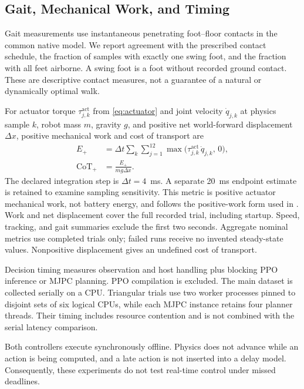 \documentclass[conference]{IEEEtran}
\begin{document}
\subsection{Gait, Mechanical Work, and Timing}\label{sec:work}

Gait measurements use instantaneous penetrating foot--floor contacts in the common native model. We report agreement with the prescribed contact schedule, the fraction of samples with exactly one swing foot, and the fraction with all feet airborne. A swing foot is a foot without recorded ground contact. These are descriptive contact measures, not a guarantee of a natural or dynamically optimal walk.

For actuator torque $\tau^{\mathrm{act}}_{j,k}$ from \eqref{eq:actuator} and joint velocity $\dot q_{j,k}$ at physics sample $k$, robot mass $m$, gravity $g$, and positive net world-forward displacement $\Delta x$, positive mechanical work and cost of transport are
\begin{equation}
\begin{aligned}
E_+&=\Delta t\sum_k\sum_{j=1}^{12}\max\bigl(\tau^{\mathrm{act}}_{j,k}\,\dot q_{j,k},\,0\bigr),\\
\mathrm{CoT}_+&=\frac{E_+}{mg\Delta x}.
\end{aligned}
\label{eq:cot}
\end{equation}
The declared integration step is $\Delta t=4$~ms. A separate 20~ms endpoint estimate is retained to examine sampling sensitivity. This metric is positive actuator mechanical work, not battery energy, and follows the positive-work form used in \cite{akki2025}. Work and net displacement cover the full recorded trial, including startup. Speed, tracking, and gait summaries exclude the first two seconds. Aggregate nominal metrics use completed trials only; failed runs receive no invented steady-state values. Nonpositive displacement gives an undefined cost of transport.

Decision timing measures observation and host handling plus blocking PPO inference or MJPC planning. PPO compilation is excluded. The main dataset is collected serially on a CPU. Triangular trials use two worker processes pinned to disjoint sets of six logical CPUs, while each MJPC instance retains four planner threads. Their timing includes resource contention and is not combined with the serial latency comparison.

Both controllers execute synchronously offline. Physics does not advance while an action is being computed, and a late action is not inserted into a delay model. Consequently, these experiments do not test real-time control under missed deadlines.
\end{document}
